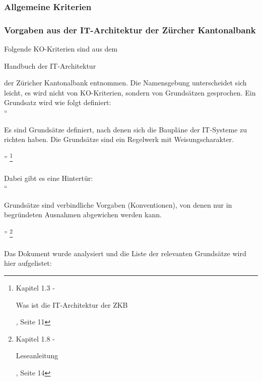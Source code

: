 \documentclass[
11pt, %
a4paper, %
BCOR25mm, %
DIV14, %
footsepline = false, %
headsepline, %
twoside, %
openright,
abstracton, %
listof=totocnumbered, %
bibliography=totocnumbered %
]{scrreprt}
\begin{document}
  \subsubsection{Allgemeine Kriterien}
  
  \subsubsection{Vorgaben aus der IT-Architektur der Zürcher Kantonalbank}
  
  Folgende KO-Kriterien sind aus dem \begin{itshape}Handbuch der
  IT-Architektur\end{itshape}\cite{ZkbHandbuchDerItArchitektur} der Züricher
  Kantonalbank entnommen. Die Namensgebung unterscheidet sich leicht, es wird
  nicht von KO-Kriterien, sondern von Grundsätzen gesprochen. Ein Grundsatz
  wird wie folgt definiert:\\
  
  ``\begin{itshape}Es sind Grundsätze definiert, nach denen sich die Baupläne
  der IT-Systeme zu richten haben. Die Grundsätze sind ein Regelwerk mit
  Weisungscharakter.\end{itshape}''
  \footnote{\cite{ZkbHandbuchDerItArchitektur} Kapitel 1.3 - \begin{itshape}Was ist die IT-Architektur der
  ZKB\end{itshape}, Seite 11}
  \\
  \\
  \noindent
  Dabei gibt es eine Hintertür:\\

  ``\begin{itshape}Grundsätze sind verbindliche Vorgaben (Konventionen), von
  denen nur in begründeten Ausnahmen abgewichen werden kann.\end{itshape}''
  \footnote{\cite{ZkbHandbuchDerItArchitektur} Kapitel 1.8 - \begin{itshape}Leseanleitung\end{itshape},
  Seite 14}
  \\
  \\
  \noindent
  Das Dokument wurde analysiert und die Liste der relevanten Grundsätze wird
  hier aufgelistet:
  
\end{document}

